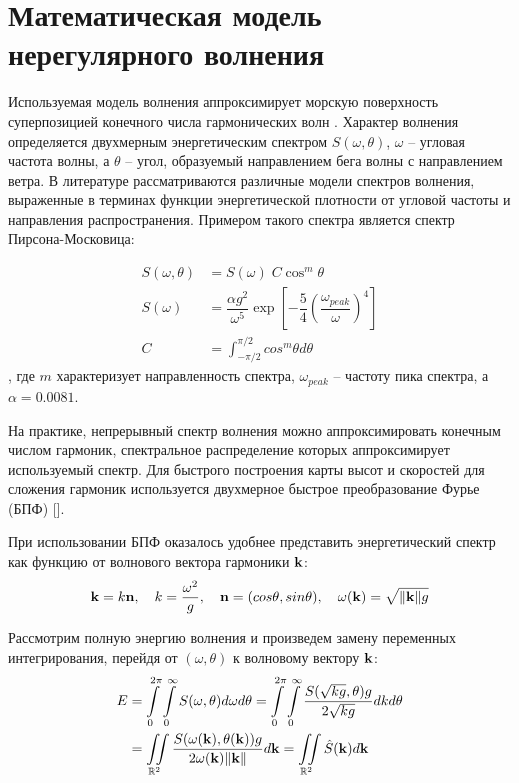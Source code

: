 \section{Математическая модель нерегулярного волнения}

Используемая модель волнения аппроксимирует морскую поверхность суперпозицией конечного числа гармонических волн \cite{lopatuhin2004}. Характер волнения определяется двухмерным энергетическим спектром $S(\omega, \theta)$, $\omega$ -- угловая частота волны, а $\theta$ -- угол, образуемый направлением бега волны с направлением ветра. В литературе \cite{lopatuhin2004} рассматриваются различные модели спектров волнения, выраженные в терминах функции энергетической плотности от угловой частоты и направления распространения. Примером такого спектра является спектр Пирсона-Московица:

\begin{equation}
\begin{split}
S(\omega, \theta) &= S(\omega) \; C \cos^m\theta \\
S(\omega) &= \dfrac{\alpha g^2}{\omega^5} \exp \left[ 
  -\dfrac{5}{4} \left( \dfrac{\omega_{peak}}{\omega} \right)^{4} 
\right]  \\
C &= \int_{-\pi/2}^{\pi/2} cos^m\theta d\theta
\end{split}
\end{equation}, 
где $m$ характеризует направленность спектра, $\omega_{peak}$ -- частоту пика спектра, а $\alpha = 0.0081$.

На практике, непрерывный спектр волнения можно аппроксимировать конечным числом гармоник, спектральное распределение которых аппроксимирует используемый спектр. Для быстрого построения карты высот и скоростей для сложения гармоник используется двухмерное быстрое преобразование Фурье (БПФ) [].
 
При использовании БПФ оказалось удобнее представить энергетический спектр как функцию от волнового вектора гармоники $\mathbf{k}$:
$$ \mathbf{k} = k\mathbf{n},\quad 
k = \frac{\omega^2}{g} ,\quad 
\mathbf{n}=(cos \theta, sin \theta), \quad 
\omega(\mathbf{k}) = \sqrt{\lVert \mathbf{k} \rVert g} $$

Рассмотрим полную энергию волнения и произведем замену переменных интегрирования, перейдя от $(\omega, \theta)$ к волновому вектору $\mathbf{k}$:
\begin{equation}
\begin{split}
E &= \int\limits_0^{2\pi}
     \int\limits_0^\infty S(\omega, \theta) d\omega d\theta
  = \int\limits_0^{2\pi}
     \int\limits_0^\infty 
         \frac {S(\sqrt{kg}, \theta)g} {2\sqrt{kg}} dk d\theta\\
  &= \iint\limits_{\mathbb{R}^2}
         \frac{S(\omega(\mathbf{k}), \theta(\mathbf{k})) g}
              {2\omega(\mathbf{k}) \lVert \mathbf{k} \rVert} d\mathbf{k}
  = \iint\limits_{\mathbb{R}^2} \hat{S}(\mathbf{k})d\mathbf{k}
\end{split}
\end{equation}

